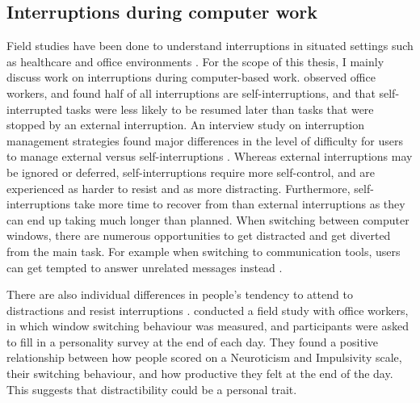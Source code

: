 \subsection{Interruptions during computer work}

Field studies have been done to understand interruptions in situated settings such as healthcare \citep[e.g.][]{Grundgeiger2010, Westbrook2010} and office environments \citep[e.g.][]{Czerwinski2004, Gonzalez2004}. For the scope of this thesis, I mainly discuss work on interruptions during computer-based work. \citet{Mark2005} observed office workers, and found half of all interruptions are self-interruptions, and that self-interrupted tasks were less likely to be resumed later than tasks that were stopped by an external interruption. An interview study on interruption management strategies found major differences in the level of difficulty for users to manage external versus self-interruptions \citep{Kim2017}. Whereas external interruptions may be ignored or deferred, self-interruptions require more self-control, and are experienced as harder to resist and as more distracting. Furthermore, self-interruptions take more time to recover from than external interruptions as they can end up taking much longer than planned. When switching between computer windows, there are numerous opportunities to get distracted and get diverted from the main task. For example when switching to communication tools, users can get tempted to answer unrelated messages instead \citep{Mark2012}. 

There are also individual differences in people's tendency to attend to distractions and resist interruptions \citep{Lyngs2018, Mark2016a}. \citet{Mark2016a} conducted a field study with office workers, in which window switching behaviour was measured, and participants were asked to fill in a personality survey at the end of each day. They found a positive relationship between how people scored on a Neuroticism and Impulsivity scale, their switching behaviour, and how productive they felt at the end of the day. This suggests that distractibility could be a personal trait.

